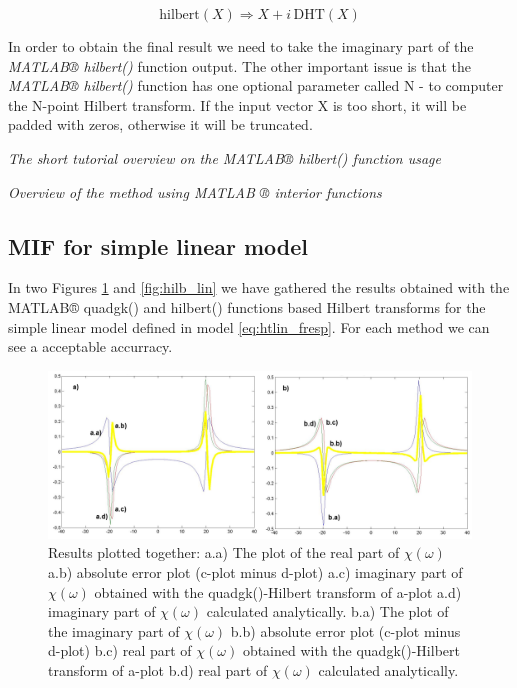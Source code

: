 \documentclass[12pt,twoside,a4paper]{article}
\numberwithin{equation}{subsection}
\numberwithin{figure}{subsection}
\begin{document}
\begin{equation} \label{eq:matlab_implication}
  \mathrm{hilbert}(X) \Rightarrow X + i\,\mathrm{DHT}(X)
\end{equation}

In order to obtain the final result we need to take the imaginary part of the \textit{MATLAB® hilbert()} function output. The other
important issue is that the \textit{MATLAB® hilbert()} function has one optional parameter called N - to computer the N-point
Hilbert transform. If the input vector X is too short, it will be padded with zeros, otherwise it will be truncated. 

\textit{The short tutorial overview on the MATLAB® hilbert() function usage}

\textit{Overview of the method using MATLAB ® interior functions}

\subsection{MIF for simple linear model} \label{chap:matlab_lin}

In two Figures \ref{fig:quadgk_lin} and \ref{fig:hilb_lin} we have gathered the results obtained with the MATLAB® quadgk() and
hilbert() functions based Hilbert transforms for the simple linear model defined in model \ref{eq:htlin_fresp}. For each method we
can see a acceptable accurracy.

\begin{figure} 
  \includegraphics[width=150mm]{img/quadgk_lin.png}
  \caption{Results plotted together: 
   a.a) The plot of the real part of $\chi (\omega )$ 
   a.b) absolute error plot (c-plot minus d-plot) 
   a.c) imaginary part of $\chi (\omega )$ obtained with the quadgk()-Hilbert transform of a-plot 
   a.d) imaginary part of $\chi (\omega )$  calculated analytically. 
   b.a) The plot of the imaginary part of $\chi (\omega )$ 
   b.b) absolute error plot (c-plot minus d-plot) 
   b.c) real part of $\chi (\omega )$ obtained with the quadgk()-Hilbert transform of a-plot 
   b.d) real part of $\chi (\omega )$ calculated analytically. \label{fig:quadgk_lin}
  }
\end{figure}
\end{document}
